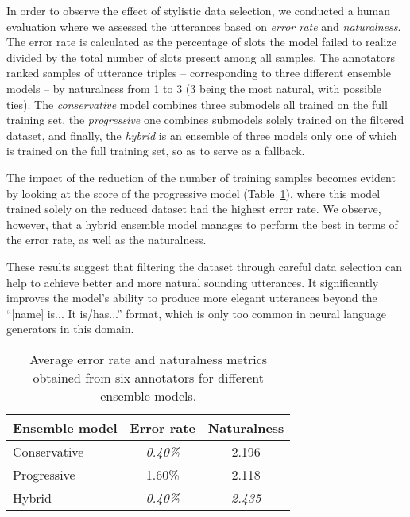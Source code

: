 \documentclass[11pt,a4paper]{article}
\begin{document}
In order to observe the effect of stylistic data selection, we conducted a human evaluation where we assessed the utterances based on \emph{error rate} and \emph{naturalness}. The error rate is calculated as the percentage of slots the model failed to realize divided by the total number of slots present among all samples. The annotators ranked samples of utterance triples -- corresponding to three different ensemble models -- by naturalness from 1 to 3 (3 being the most natural, with possible ties). The \emph{conservative} model combines three submodels all trained on the full training set, the \emph{progressive} one combines submodels solely trained on the filtered dataset, and finally, the \emph{hybrid} is an ensemble of three models only one of which is trained on the full training set, so as to serve as a fallback.

The impact of the reduction of the number of training samples becomes evident by looking at the score of the progressive model (Table~\ref{table:results_naturalness}), where this model trained solely on the reduced dataset had the highest error rate. We observe, however, that a hybrid ensemble model manages to perform the best in terms of the error rate, as well as the naturalness.

These results suggest that filtering the dataset through careful data selection can help to achieve better and more natural sounding utterances. It significantly improves the model's ability to produce more elegant utterances beyond the ``[name] is... It is/has...'' format, which is only too common in neural language generators in this domain.

\begin{table}
  \centering
  \begin{tabular}{p{2.8cm} c c}
    \toprule
    \textbf{Ensemble model}& \textbf{Error rate}	& \textbf{Naturalness}	\\[0.25ex] \midrule
    Conservative	& \emph{0.40\%}	& 2.196	\\
    Progressive		& 1.60\%	& 2.118	\\
    \midrule
    Hybrid			& \emph{0.40\%}	& \emph{2.435}	\\
    \bottomrule
  \end{tabular}
  \vspace{-0.1cm}
  \caption{Average error rate and naturalness metrics obtained from six annotators for different ensemble models.}
  \label{table:results_naturalness}
\end{table}
\end{document}
